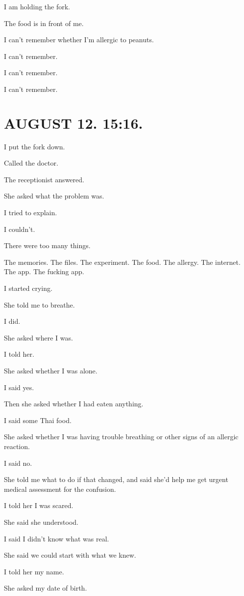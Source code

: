 \documentclass[11pt,oneside]{book}
\begin{document}
I am holding the fork.

The food is in front of me.

I can't remember whether I'm allergic to peanuts.

I can't remember.

I can't remember.

I can't remember.

\section*{AUGUST 12. 15:16.}

I put the fork down.

Called the doctor.

The receptionist answered.

She asked what the problem was.

I tried to explain.

I couldn't.

There were too many things.

The memories. The files. The experiment. The food. The allergy. The internet. The app. The fucking app.

I started crying.

She told me to breathe.

I did.

She asked where I was.

I told her.

She asked whether I was alone.

I said yes.

Then she asked whether I had eaten anything.

I said some Thai food.

She asked whether I was having trouble breathing or other signs of an allergic reaction.

I said no.

She told me what to do if that changed, and said she'd help me get urgent medical assessment for the confusion.

I told her I was scared.

She said she understood.

I said I didn't know what was real.

She said we could start with what we knew.

I told her my name.

She asked my date of birth.
\end{document}
